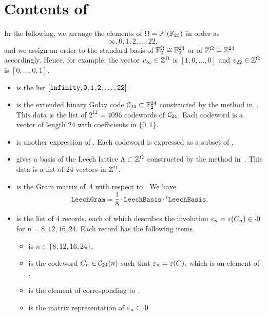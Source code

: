 \documentclass{amsart} %
\begin{document}
\section{Contents of }
%
In the following, we arrange the elements of $\Omega=\mathord{\mathbb{P}}^1(\mathord{\mathbb{F}}_{23})$ in order as 
\[
\infty, 0, 1,2 , \dots, 22, 
\]
and we  assign an order to the standard  basis of 
$\mathord{\mathbb{F}}_2^{\Omega}\cong \mathord{\mathbb{F}}_2^{24}$ or of $\mathord{\mathbb{Z}}^{\Omega}\cong \mathord{\mathbb{Z}}^{24}$
accordingly.
Hence, 
for example, the vector $v_{\infty}\in \mathord{\mathbb{Z}}^{\Omega}$ is $[1, 0, \dots, 0]$
and $v_{22}\in \mathord{\mathbb{Z}}^{\Omega}$ is $[0, \dots, 0, 1]$.
%
\begin{itemize}
%
\item {} is the list
$\tt{[infinity, 0,1,2,\dots, 22]}$.
%
\item {} is the extended binary Golay code $\mathord{\mathcal{C}}_{24}\subset \mathord{\mathbb{F}}_2^{24}$
constructed by the method in~\cite[Chapter~10.2]{TheCSbook}.
This data is the list of $2^{12}=4096$ codewords of $\mathord{\mathcal{C}}_{24}$.
Each codeword is a vector of length $24$
  with coefficients in $\{0, 1\}$.
  \item {} is another expression of .
Each codeword is expressed as a subset of .
%
\item {} gives a basis of the Leech lattice $\Lambda\subset \mathord{\mathbb{Z}}^{\Omega}$
constructed by the method in~\cite[Chapter~10.3]{TheCSbook}.
This data   is a list of $24$ vectors in $\mathord{\mathbb{Z}}^{\Omega}$.
%
\item {} is the Gram matrix of  $\Lambda$
with respect to . We have
\[
\mathtt{LeechGram} =\frac{1}{8}\cdot \mathtt{LeechBasis}\cdot{}^{t} \mathtt{LeechBasis}.
\]
%
\item {} is the list of $4$ records,
each of which describes the involution $\varepsilon_n=\varepsilon(C_n)\in \cdot 0$
for $n=8, 12, 16, 24$.
Each record has the following items.
%
%
\begin{itemize}
%
\item {} is $n\in \{8, 12, 16, 24\}$.
%
\item {} is the codeword $C_n\in \mathord{\mathcal{C}}_{24}(n)$ such that $\varepsilon_n=\varepsilon(C)$,
which is an element of .
%
\item {} is the  element of  corresponding to .
%
\item {} is the matrix representation of $\varepsilon_n\in \cdot 0$

\end{itemize}
\end{itemize}
\end{document}
